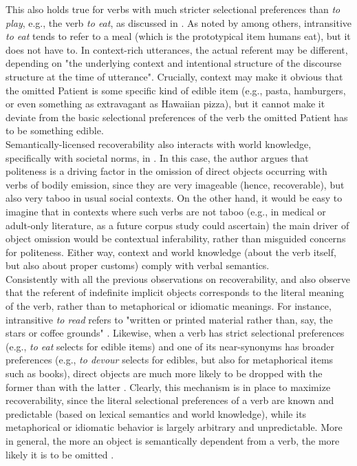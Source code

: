 This also holds true for verbs with much stricter selectional preferences than \textit{to play}, e.g., the verb \textit{to eat}, as discussed in . As noted by \textcite[149]{Cote1996} among others, intransitive \textit{to eat} tends to refer to a meal (which is the prototypical item humans eat), but it does not have to. In context-rich utterances, the actual referent may be different, depending on "the underlying context and intentional structure of the discourse structure at the time of utterance". Crucially, context may make it obvious that the omitted Patient is some specific kind of edible item (e.g., pasta, hamburgers, or even something as extravagant as Hawaiian pizza), but it cannot make it deviate from the basic selectional preferences of the verb \textemdash the omitted Patient has to be something edible.\\
Semantically-licensed recoverability also interacts with world knowledge, specifically with societal norms, in \textcite{Goldberg2005}. In this case, the author argues that politeness is a driving factor in the omission of direct objects occurring with verbs of bodily emission, since they are very imageable (hence, recoverable), but also very taboo in usual social contexts. On the other hand, it would be easy to imagine that in contexts where such verbs are not taboo (e.g., in medical or adult-only literature, as a future corpus study could ascertain) the main driver of object omission would be contextual inferability, rather than misguided concerns for politeness. Either way, context and world knowledge (about the verb itself, but also about proper customs) comply with verbal semantics.\\
Consistently with all the previous observations on recoverability, \textcite{Mittwoch2005} and \textcite{Glass2013} also observe that the referent of indefinite implicit objects corresponds to the literal meaning of the verb, rather than to metaphorical or idiomatic meanings. For instance, intransitive \textit{to read} refers to "written or printed material rather than, say, the stars or coffee grounds" \parencite[2]{Mittwoch2005}. Likewise, when a verb has strict selectional preferences (e.g., \textit{to eat} selects for edible items) and one of its near-synonyms has broader preferences (e.g., \textit{to devour} selects for edibles, but also for metaphorical items such as books), direct objects are much more likely to be dropped with the former than with the latter \parencite[5]{Glass2013}. Clearly, this mechanism is in place to maximize recoverability, since the literal selectional preferences of a verb are known and predictable (based on lexical semantics and world knowledge), while its metaphorical or idiomatic behavior is largely arbitrary and unpredictable. More in general, the more an object is semantically dependent from a verb, the more likely it is to be omitted \parencite[203-204]{Rice1988}.


